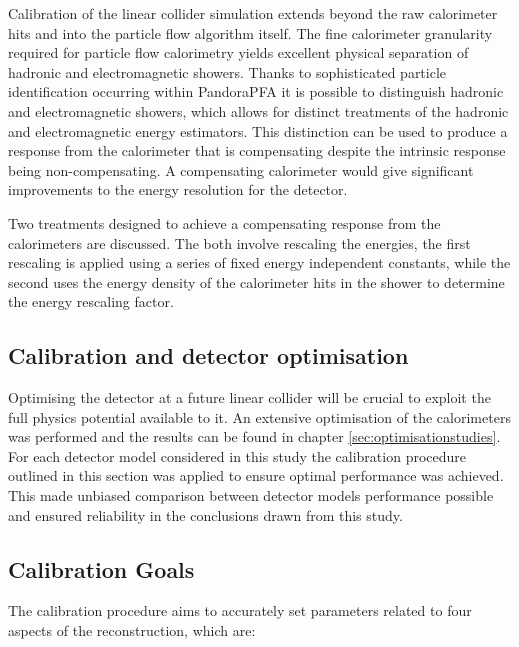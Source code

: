 Calibration of the linear collider simulation extends beyond the raw calorimeter hits and into the particle flow algorithm itself.  The fine calorimeter granularity required for particle flow calorimetry yields excellent physical separation of hadronic and electromagnetic showers.  Thanks to sophisticated particle identification occurring within PandoraPFA it is possible to distinguish hadronic and electromagnetic showers, which allows for distinct treatments of the hadronic and electromagnetic energy estimators.  This distinction can be used to produce a response from the calorimeter that is compensating despite the intrinsic response being non-compensating.  A compensating calorimeter would give significant improvements to the energy resolution for the detector.

Two treatments designed to achieve a compensating response from the calorimeters are discussed.  The both involve rescaling the energies, the first rescaling is applied using a series of fixed energy independent constants, while the second uses the energy density of the calorimeter hits in the shower to determine the energy rescaling factor.


\subsection{Calibration and detector optimisation}
Optimising the detector at a future linear collider will be crucial to exploit the full physics potential available to it.  An extensive optimisation of the calorimeters was performed and the results can be found in chapter \ref{sec:optimisationstudies}.  For each detector model considered in this study the calibration procedure outlined in this section was applied to ensure optimal performance was achieved.  This made unbiased comparison between detector models performance possible and ensured reliability in the conclusions drawn from this study.


\subsection{Calibration Goals}
The calibration procedure aims to accurately set parameters related to four aspects of the reconstruction, which are:

